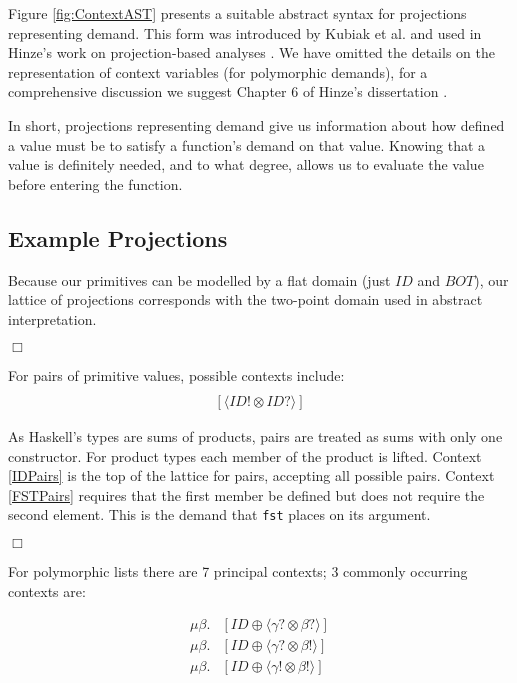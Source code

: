 Figure \ref{fig:ContextAST} presents a suitable abstract syntax for projections
representing demand.  This form was introduced by Kubiak et al. and used in
Hinze's work on projection-based analyses \citep{kubiak, hinze1995projection}.
We have omitted the details on the representation of context variables (for
polymorphic demands), for a comprehensive discussion we suggest Chapter 6 of Hinze's
dissertation \citep{hinze1995projection}.

In short, projections representing demand give us information about how defined
a value must be to satisfy a function's demand on that value. Knowing that a
value is definitely needed, and to what degree, allows us to evaluate the value
before entering the function.

\subsection*{Example Projections}

Because our primitives can be modelled by a flat domain (just $ID$ and $BOT$),
our lattice of projections corresponds with the two-point domain used in
abstract interpretation.

\hfill$\Box$

For pairs of primitive values, possible contexts include:
\begin{align}
[\langle ID? \otimes ID? \rangle] \label{IDPairs} \\
[\langle ID! \otimes ID? \rangle] \label{FSTPairs}
\end{align}


As Haskell's types are sums of products, pairs are treated as sums with only
one constructor.  For product types each member of the product is lifted.
Context \ref{IDPairs} is the top of the lattice for pairs, accepting all
possible pairs. Context \ref{FSTPairs} requires that the first member be
defined but does not require the second element. This is the demand that
\verb-fst- places on its argument.

\hfill$\Box$

For polymorphic lists there are 7 principal contexts; 3 commonly occurring contexts are:

\begin{align}
    \mu\beta.&[ID \oplus \langle \gamma? \otimes \beta?\rangle] \label{IDList} \\
    \mu\beta.&[ID \oplus \langle \gamma? \otimes \beta!\rangle] \label{FINList} \\
    \mu\beta.&[ID \oplus \langle \gamma! \otimes \beta!\rangle] \label{FULLList}
\end{align}


